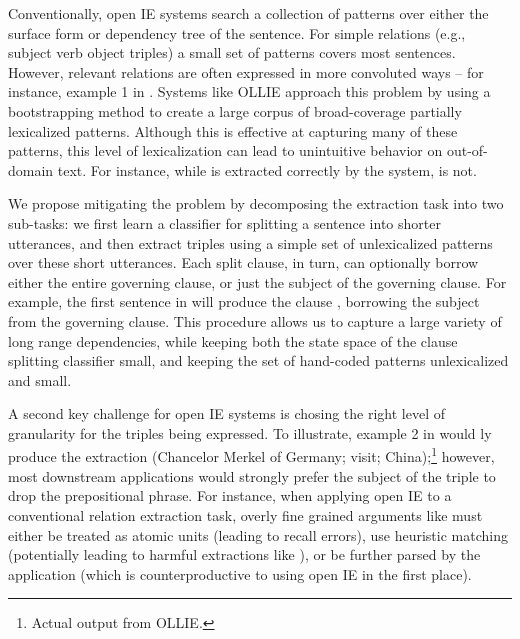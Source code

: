 Conventionally, open IE systems search a collection of patterns over either
  the surface form or dependency tree of the sentence.
For simple relations (e.g., subject verb object triples) a small set of
  patterns covers most sentences.
However, relevant relations are often expressed in more convoluted
  ways -- for instance, example 1 in .
Systems like OLLIE \cite{key:2012mausam-ollie} approach this problem by 
  using a bootstrapping method to create a large corpus of broad-coverage
  partially lexicalized patterns.
Although this is effective at capturing many of these patterns,
  this level of lexicalization can lead to unintuitive behavior on 
  out-of-domain text.
For instance, while  is extracted correctly by
  the system,  is not.

We propose mitigating the problem by decomposing the extraction task into
  two sub-tasks:
  we first learn a classifier for splitting a sentence into shorter
  utterances, and then extract triples using a simple set of
  unlexicalized patterns over these short utterances.
Each split clause, in turn, can optionally borrow either the entire
  governing clause, or just the subject of the governing clause.
For example, the first sentence in  will produce the
  clause , borrowing the subject
   from the governing clause.
This procedure allows us to capture a large variety of long range 
  dependencies, while keeping both the state space of the clause splitting
  classifier small, and keeping the set of hand-coded patterns unlexicalized
  and small.

A second key challenge for open IE systems is chosing the right level of
  granularity for the triples being expressed.
To illustrate, example 2 in  would \naive ly produce
  the extraction (Chancelor Merkel of Germany; visit; China);\footnote{
    Actual output from OLLIE.
  }
  however, most downstream applications would strongly prefer the subject
  of the triple to drop the prepositional phrase.
For instance, when applying open IE to a conventional relation extraction
  task, overly fine grained arguments like 
  must either be treated as atomic units (leading to recall errors),
  use heuristic matching (potentially leading to harmful extractions
  like ), or be further parsed by the application
  (which is counterproductive to using open IE in the first place).
  
